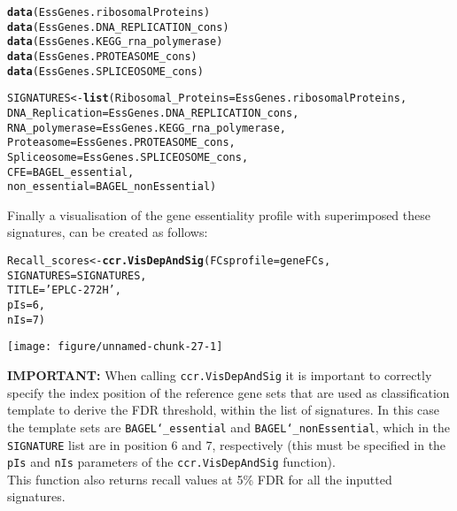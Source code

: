 \documentclass{article}\usepackage[]{graphicx}\usepackage[]{color}
\makeatletter
\def\maxwidth{ %
  \ifdim\Gin@nat@width>\linewidth
    \linewidth
  \else
    \Gin@nat@width
  \fi
}
\newcommand{\hlnum}[1]{\textcolor[rgb]{0.686,0.059,0.569}{#1}}%
\newcommand{\hlstr}[1]{\textcolor[rgb]{0.192,0.494,0.8}{#1}}%
\newcommand{\hlstd}[1]{\textcolor[rgb]{0.345,0.345,0.345}{#1}}%
\newcommand{\hlkwb}[1]{\textcolor[rgb]{0.69,0.353,0.396}{#1}}%
\newcommand{\hlkwc}[1]{\textcolor[rgb]{0.333,0.667,0.333}{#1}}%
\newcommand{\hlkwd}[1]{\textcolor[rgb]{0.737,0.353,0.396}{\textbf{#1}}}%
\newenvironment{kframe}{%
 \def\at@end@of@kframe{}%
 \ifinner\ifhmode%
  \def\at@end@of@kframe{\end{minipage}}%
  \begin{minipage}{\columnwidth}%
 \fi\fi%
 \def\FrameCommand##1{\hskip\@totalleftmargin \hskip-\fboxsep
 \colorbox{shadecolor}{##1}\hskip-\fboxsep
     \hskip-\linewidth \hskip-\@totalleftmargin \hskip\columnwidth}%
 \MakeFramed {\advance\hsize-\width
   \@totalleftmargin\z@ \linewidth\hsize
   \@setminipage}}%
 {\par\unskip\endMakeFramed%
 \at@end@of@kframe}
\newenvironment{knitrout}{}{} %
\makeatother
\begin{document}
\begin{knitrout}
\color{fgcolor}\begin{kframe}
\begin{alltt}
\hlkwd{data}\hlstd{(EssGenes.ribosomalProteins)}
\hlkwd{data}\hlstd{(EssGenes.DNA_REPLICATION_cons)}
\hlkwd{data}\hlstd{(EssGenes.KEGG_rna_polymerase)}
\hlkwd{data}\hlstd{(EssGenes.PROTEASOME_cons)}
\hlkwd{data}\hlstd{(EssGenes.SPLICEOSOME_cons)}

\hlstd{SIGNATURES}\hlkwb{<-}\hlkwd{list}\hlstd{(}\hlkwc{Ribosomal_Proteins}\hlstd{=EssGenes.ribosomalProteins,}
                 \hlkwc{DNA_Replication} \hlstd{= EssGenes.DNA_REPLICATION_cons,}
                 \hlkwc{RNA_polymerase} \hlstd{= EssGenes.KEGG_rna_polymerase,}
                 \hlkwc{Proteasome} \hlstd{= EssGenes.PROTEASOME_cons,}
                 \hlkwc{Spliceosome} \hlstd{= EssGenes.SPLICEOSOME_cons,}
                 \hlkwc{CFE} \hlstd{= BAGEL_essential,}
                 \hlkwc{non_essential} \hlstd{= BAGEL_nonEssential)}
\end{alltt}
\end{kframe}
\end{knitrout}
% 
Finally a visualisation of the gene essentiality profile with superimposed these signatures, can be created as follows:
 
\begin{knitrout}
\color{fgcolor}\begin{kframe}
\begin{alltt}
\hlstd{Recall_scores}\hlkwb{<-}\hlkwd{ccr.VisDepAndSig}\hlstd{(}\hlkwc{FCsprofile} \hlstd{= geneFCs,}
                             \hlkwc{SIGNATURES} \hlstd{= SIGNATURES,}
                             \hlkwc{TITLE} \hlstd{=} \hlstr{'EPLC-272H'}\hlstd{,}
                             \hlkwc{pIs} \hlstd{=} \hlnum{6}\hlstd{,}
                             \hlkwc{nIs} \hlstd{=} \hlnum{7}\hlstd{)}
\end{alltt}
\end{kframe}

{\centering \texttt{[image: figure/unnamed-chunk-27-1]} 

}



\end{knitrout}
% 
\textbf{IMPORTANT:} When calling \texttt{ccr.VisDepAndSig} it is important to correctly specify the index position of the reference gene sets that are used as classification template to derive the FDR threshold, within the list of signatures. In this case the template sets are \texttt{BAGEL\char`_essential} and \texttt{BAGEL\char`_nonEssential}, which in the \texttt{SIGNATURE} list are in position 6 and 7, respectively (this must be specified in the \texttt{pIs} and \texttt{nIs} parameters of the \texttt{ccr.VisDepAndSig} function).\\
% 
This function also returns recall values at 5\% FDR for all the inputted signatures.
\end{document}
